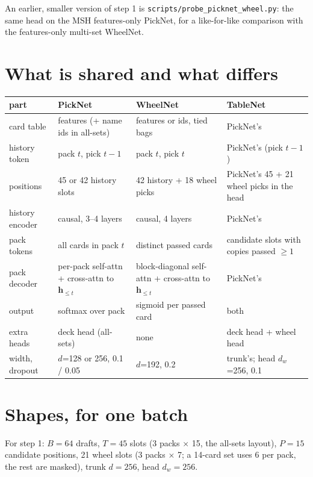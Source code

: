 \documentclass[11pt,letterpaper]{article}
\newcommand{\code}[1]{\texttt{\small #1}}
\begin{document}
An earlier, smaller version of step 1 is \code{scripts/probe\_picknet\_wheel.py}: the same head on the MSH
features-only PickNet, for a like-for-like comparison with the features-only multi-set WheelNet.

\section{What is shared and what differs}

\begin{center}\small
\begin{tabular}{p{3.3cm}p{3.6cm}p{3.6cm}p{3.6cm}}
\toprule
part & PickNet & WheelNet & TableNet \\
\midrule
card table & features (+ name ids in all-sets) & features or ids, tied bags & PickNet's \\
history token & pack $t$, pick $t-1$ & pack $t$, pick $t$ & PickNet's (pick $t-1$) \\
positions & 45 or 42 history slots & 42 history + 18 wheel picks & PickNet's 45 + 21 wheel picks in the head \\
history encoder & causal, 3--4 layers & causal, 4 layers & PickNet's \\
pack tokens & all cards in pack $t$ & distinct passed cards & candidate slots with copies passed $\ge1$ \\
pack decoder & per-pack self-attn + cross-attn to $\mathbf h_{\le t}$ & block-diagonal self-attn + cross-attn to $\mathbf h_{\le t}$ & PickNet's \\
output & softmax over pack & sigmoid per passed card & both \\
extra heads & deck head (all-sets) & none & deck head + wheel head \\
width, dropout & $d$=128 or 256, 0.1 / 0.05 & $d$=192, 0.2 & trunk's; head $d_w$=256, 0.1 \\
\bottomrule
\end{tabular}
\end{center}

\section{Shapes, for one batch}

For step 1: $B=64$ drafts, $T=45$ slots (3 packs $\times$ 15, the all-sets layout), $P=15$ candidate
positions, 21 wheel slots (3 packs $\times$ 7; a 14-card set uses 6 per pack, the rest are masked), trunk
$d=256$, head $d_w=256$.
\end{document}
